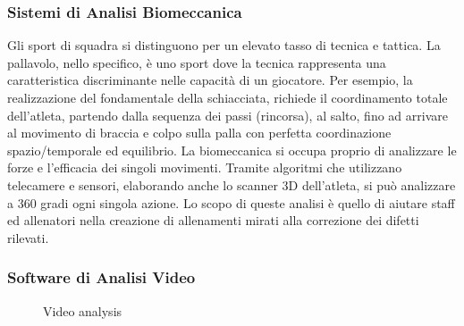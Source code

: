 

\subsubsection{Sistemi di Analisi Biomeccanica}
Gli sport di squadra si distinguono per un elevato tasso di tecnica e tattica. La pallavolo,  nello specifico, è uno sport dove la tecnica rappresenta una caratteristica discriminante nelle capacità di un giocatore. Per esempio, la realizzazione del fondamentale della schiacciata, richiede il coordinamento totale dell'atleta, partendo dalla sequenza dei passi (rincorsa), al salto, fino ad arrivare al movimento di braccia e colpo sulla palla con perfetta coordinazione spazio/temporale ed equilibrio. La biomeccanica si occupa proprio di analizzare le forze e l'efficacia dei singoli movimenti. Tramite algoritmi che utilizzano telecamere e sensori, elaborando anche lo scanner 3D dell'atleta, si può analizzare a 360 gradi ogni singola azione. Lo scopo di queste analisi è quello di aiutare staff ed allenatori nella creazione di allenamenti mirati alla correzione dei difetti rilevati.


\subsubsection{Software di Analisi Video}
\begin{wrapfigure}{r}{0.4\textwidth}
    \centering
    \vspace{-10px}
    \caption{Video analysis}
    \label{fig:Video analysis}
\end{wrapfigure}

